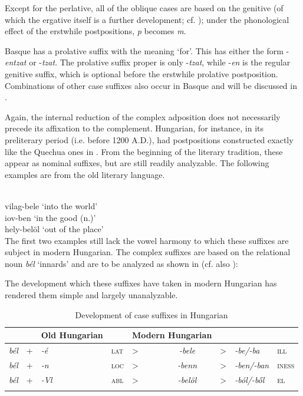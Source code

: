 Except for the perlative, all of the oblique cases are based on the genitive (of which the ergative itself is a further development; cf. ); under the phonological effect of the erstwhile postpositions, \textit{p} becomes \textit{m}. 

Basque has a prolative suffix with the meaning ‘for’. This has either the form -\textit{entzat} or -\textit{tzat}. The prolative suffix proper is only -\textit{tzat}, while -\textit{en} is the regular genitive suffix, which is optional before the erstwhile prolative postposition. Combinations of other case suffixes also occur in Basque and will be discussed in .

Again, the internal reduction of the complex adposition does not necessarily precede its affixation to the complement. Hungarian, for instance, in its preliterary period (i.e. before 1200 A.D.), had postpositions constructed exactly like the Quechua ones in . From the beginning of the literary tradition, these appear as nominal suffixes, but are still readily analyzable. The following examples are from the old literary language.

\ea\label{ex:E58}
\\
 \ea vilag-bele  
 \glt ‘into the world’\\
\ex iov-ben
\glt ‘in the good (n.)’\\
\ex hely-belöl 
\glt ‘out of the place’\\
\z
\z
\noindent The first two examples still lack the vowel harmony to which these suffixes are subject in modern Hungarian. The complex suffixes are based on the relational noun \textit{bél} ‘innards’ and are to be analyzed as shown in  (cf. also \citealt[118--121]{Kahr1976}):

The development which these suffixes have taken in modern Hungarian has rendered them simple and largely unanalyzable.

\begin{table}
\begin{tabular}{lllllclll}
\lsptoprule
\multicolumn{4}{l}{components} &  & Old Hungarian &  & \multicolumn{2}{l}{Modern Hungarian}\\
\midrule
\itshape bél & + & \itshape {}-é & \textsc{lat}{}{} & {\textgreater} & \itshape {}-bele & {\textgreater} & \itshape {}-be/-ba & \scshape ill\\
\itshape bél & + & \itshape {}-n & \textsc{loc}{}{} & {\textgreater} & \itshape {}-benn & {\textgreater} & \itshape {}-ben/-ban & \scshape iness\\
\itshape bél & + & \itshape {}-Vl & \textsc{abl}{}{} & {\textgreater} & \itshape {}-belöl & {\textgreater} & \itshape {}-ból/-ből & \scshape el\\
\lspbottomrule
\end{tabular}
\caption{Development of case suffixes in Hungarian}\label{tab:DevHung}
\end{table}




